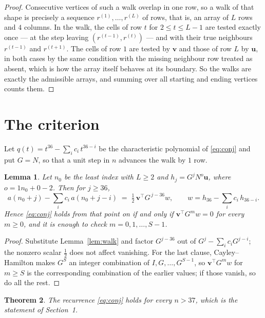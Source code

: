\documentclass[11pt,a4paper]{article}
\theoremstyle{plain}
\newtheorem{theorem}{Theorem}
\newtheorem{lemma}[theorem]{Lemma}
\theoremstyle{definition}
\begin{document}
\begin{proof}
Consecutive vertices of such a walk overlap in one row, so a walk of that shape is
precisely a sequence $r^{(1)},\dots,r^{(L)}$ of rows, that is, an array of $L$ rows
and $4$ columns. In the walk, the cells of row $t$ for $2\le t\le L-1$ are tested
exactly once --- at the step leaving $(r^{(t-1)},r^{(t)})$ --- and with their true
neighbours $r^{(t-1)}$ and $r^{(t+1)}$. The cells of row $1$ are tested by
$\mathbf{v}$ and those of row $L$ by $\mathbf{u}$, in both cases by the same condition
with the missing neighbour row treated as absent, which is how the array itself behaves at
its boundary. So the walks are exactly the admissible arrays, and summing over all starting
and ending vertices counts them.
\end{proof}

\section{The criterion}

Let $q(t)=t^{36}-\sum_i c_i\,t^{36-i}$ be the characteristic polynomial of
\eqref{eq:conj} and put $G=N$, so that a unit step in $n$ advances the walk by
$1$ row.

\begin{lemma}\label{lem:crit}
Let $n_0$ be the least index with $L\ge2$ and $h_j=G^{j}N^{o}\mathbf{u}$, where
$o=1n_0+0-2$. Then for $j\ge36$,
\[
a(n_0+j)-\sum_i c_i\,a(n_0+j-i)\;=\;\tfrac1{2}\,\mathbf{v}^{\!\top}G^{\,j-36}w,
\qquad w=h_{36}-\sum_i c_i\,h_{36-i} .
\]
Hence \eqref{eq:conj} holds from that point on if and only if
$\mathbf{v}^{\!\top}G^{m}w=0$ for every $m\ge0$, and it is enough to check
$m=0,1,\dots,S-1$.
\end{lemma}

\begin{proof}
Substitute Lemma~\ref{lem:walk} and factor $G^{j-36}$ out of
$G^{j}-\sum_ic_iG^{j-i}$; the nonzero scalar $\tfrac1{2}$ does not affect
vanishing. For the last clause, Cayley--Hamilton makes $G^{S}$ an integer combination of
$I,G,\dots,G^{S-1}$, so $\mathbf{v}^{\!\top}G^{m}w$ for $m\ge S$ is the corresponding
combination of the earlier values; if those vanish, so do all the rest.
\end{proof}

\begin{theorem}
The recurrence \eqref{eq:conj} holds for every $n>37$, which is the statement of
Section~1.
\end{theorem}
\end{document}
